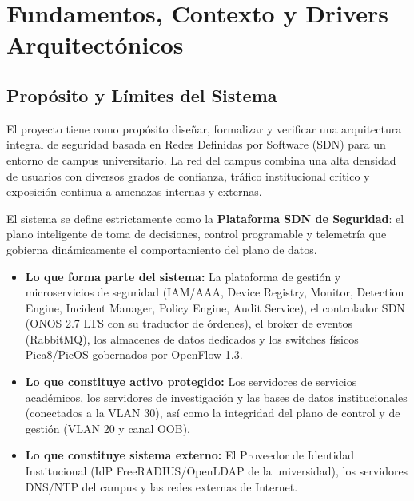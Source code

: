 \documentclass[11pt,a4paper]{report}
\begin{document}
\tableofcontents
\newpage

\chapter{Fundamentos, Contexto y Drivers Arquitectónicos}

\section{Propósito y Límites del Sistema}
El proyecto tiene como propósito diseñar, formalizar y verificar una arquitectura integral de seguridad basada en Redes Definidas por Software (SDN) para un entorno de campus universitario. La red del campus combina una alta densidad de usuarios con diversos grados de confianza, tráfico institucional crítico y exposición continua a amenazas internas y externas.

El sistema se define estrictamente como la \textbf{Plataforma SDN de Seguridad}: el plano inteligente de toma de decisiones, control programable y telemetría que gobierna dinámicamente el comportamiento del plano de datos.
\begin{itemize}[leftmargin=*]
    \item \textbf{Lo que forma parte del sistema:} La plataforma de gestión y microservicios de seguridad (IAM/AAA, Device Registry, Monitor, Detection Engine, Incident Manager, Policy Engine, Audit Service), el controlador SDN (ONOS 2.7 LTS con su traductor de órdenes), el broker de eventos (RabbitMQ), los almacenes de datos dedicados y los switches físicos Pica8/PicOS gobernados por OpenFlow 1.3.
    \item \textbf{Lo que constituye activo protegido:} Los servidores de servicios académicos, los servidores de investigación y las bases de datos institucionales (conectados a la VLAN 30), así como la integridad del plano de control y de gestión (VLAN 20 y canal OOB).
    \item \textbf{Lo que constituye sistema externo:} El Proveedor de Identidad Institucional (IdP FreeRADIUS/OpenLDAP de la universidad), los servidores DNS/NTP del campus y las redes externas de Internet.
\end{itemize}
\end{document}
